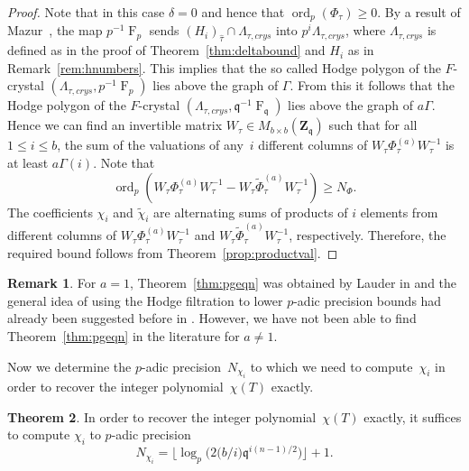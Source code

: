\documentclass[a4paper,11pt]{article}
\numberwithin{equation}{section}
\providecommand{\floorbig}[1]{\bigl\lfloor#1\bigr\rfloor} %
\newcommand{\ZZ}{\mathbf{Z}} %
\DeclareMathOperator{\ord}{ord}          %
\DeclareMathOperator{\Frob}{F}           %
\theoremstyle{definition}
\newtheorem{thm}{Theorem}[section]
\newtheorem{rem}[thm]{Remark}
\begin{document}
\begin{proof} 
Note that in this case $\delta=0$ and hence that $\ord_p(\Phi_{\tau}) \geq 0$. 
By a result of Mazur~\citep[p.\ 665--666]{Mazur1972}, the map $p^{-1} \Frob_p$ 
sends $(H_i)_{\hat{\tau}} \cap \Lambda_{\tau,crys}$ into $p^i \Lambda_{\tau,crys}$, 
where $\Lambda_{\tau,crys}$ is defined as in the proof of 
Theorem~\ref{thm:deltabound} and $H_i$ as in Remark~\ref{rem:hnumbers}. 
This implies that the so called Hodge polygon of the 
$F$-crystal $(\Lambda_{\tau,crys},p^{-1} \Frob_p)$ lies above the graph of 
$\Gamma$. From this it follows that the Hodge polygon of the $F$-crystal 
$(\Lambda_{\tau,crys},\mathfrak{q}^{-1} \Frob_{\mathfrak{q}})$ lies
above the graph of $a\Gamma$. Hence we can find an invertible matrix 
$W_{\tau} \in M_{b \times b}(\ZZ_{\mathfrak{q}})$ such that for all 
$1 \leq i \leq b$, the sum of the valuations of any~$i$ different columns
of $W_{\tau} \Phi_{\tau}^{(a)} W_{\tau}^{-1}$ is at least $a\Gamma(i)$.
Note that 
\[ \ord_p(W_{\tau }\Phi_{\tau}^{(a)} W_{\tau}^{-1}-W_{\tau } \tilde{\Phi}_{\tau}^{(a)} W_{\tau}^{-1}) \geq N_{\Phi}.\]
The coefficients $\chi_i$ and $\tilde{\chi}_i$ are alternating sums 
of products of $i$ elements from different columns of 
$W_{\tau }\Phi_{\tau}^{(a)} W_{\tau}^{-1}$ 
and $W_{\tau } \tilde{\Phi}_{\tau}^{(a)} W_{\tau}^{-1}$, respectively.  
Therefore, the required bound follows from Theorem~\ref{prop:productval}. 
\end{proof}

\begin{rem}
For $a=1$, Theorem~\ref{thm:pgeqn} was obtained by Lauder in \citep[Proposition 9.4]{Lauder2006} and
the general idea of using the Hodge filtration to lower $p$-adic precision bounds had already been 
suggested before in \citep[Remark 1.6.4]{AbbottKedlayaRoe2006}. However, we have not been able
to find Theorem~\ref{thm:pgeqn} in the literature for $a \neq 1$. 
\end{rem}

Now we determine the $p$-adic precision~$N_{\chi_i}$ to which we need to compute~$\chi_i$ 
in order to recover the integer polynomial~$\chi(T)$ exactly.

\begin{thm} \label{thm:N0}
In order to recover the integer polynomial~$\chi(T)$ exactly, 
it suffices to compute $\chi_i$ to $p$-adic precision 
\begin{equation*}
N_{\chi_i} = \floorbig{\log_p \bigl( 2 \bigl( b/i \bigr) \mathfrak{q}^{i (n-1) / 2} \bigr)} + 1.
\end{equation*}
\end{thm}
\end{document}
